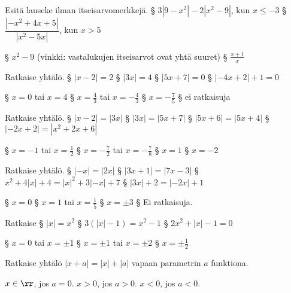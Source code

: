 \begin{tehtavasivu}
\begin{tehtava}
	Esitä lauseke ilman itseisarvomerkkejä.
	\alakohdat
		§ $3|9-x^2|-2|x^2-9|$, kun $x\leq-3$
		§ $\dfrac{|-x^2+4x+5|}{|x^2-5x|}$, kun $x>5$
	\loppu
	\begin{vastaus}
		\alakohdat
			§ $x^2-9$ (vinkki: vastalukujen itseisarvot ovat yhtä suuret)
			§ $\frac{x+1}{x}$
		\loppu
	\end{vastaus}
\end{tehtava}

\begin{tehtava}
	Ratkaise yhtälö.
	\alakohdat
		§ $|x-2|=2$
		§ $|3x|=4$
		§ $|5x+7|=0$
		§ $|-4x+2|+1=0$
	\loppu
	\begin{vastaus}
		\alakohdat
			§ $x=0$ tai $x=4$
			§ $x=\frac{4}{3}$ tai $x=-\frac{4}{3}$
			§ $x=-\frac{7}{5}$
			§ ei ratkaisuja
		\loppu
	\end{vastaus}
\end{tehtava}

\begin{tehtava}
	Ratkaise yhtälö.
	\alakohdat
		§ $|x-2|=|3x|$
		§ $|3x|=|5x+7|$
		§ $|5x+6|=|5x+4|$
		§ $|-2x+2|=|x^2+2x+6|$
	\loppu
	\begin{vastaus}
		\alakohdat
			§ $x=-1$ tai $x=\frac{1}{2}$
			§ $x=-\frac{7}{2}$ tai $x=-\frac{7}{8}$
			§ $x=1$
			§ $x=-2$
		\loppu
	\end{vastaus}
\end{tehtava}

\begin{tehtava}
	Ratkaise yhtälö.
	\alakohdat
		§ $|-x| = |2x|$
		§ $|3x+1|= |7x-3|$
		§ $x^2+4|x|+4 = |x|^2+3|-x|+7$
		§ $|3x|+2 = |-2x|+1$
	\loppu
	\begin{vastaus}
		\alakohdat
			§ $x = 0$
			§ $x = 1$ tai $x = \frac{1}{5}$
			§ $x = \pm 3$
			§ Ei ratkaisuja.
		\loppu
	\end{vastaus}
\end{tehtava}

\begin{tehtava}
	Ratkaise
	\alakohdat
		§ $|x| = x^2$
		§ $3(|x|-1) = x^2-1$
		§ $2x^2+|x|-1 = 0$
	\loppu
	\begin{vastaus}
		\alakohdat
			§ $x = 0$ tai $x = \pm 1$
			§ $x = \pm 1$ tai $x = \pm 2$
			§ $x = \pm \frac{1}{2}$
		\loppu
	\end{vastaus}
\end{tehtava}

\begin{tehtava}
	Ratkaise yhtälö $|x+a| = |x|+|a|$ vapaan parametrin $a$ funktiona.
	\begin{vastaus}
		$x \in \rr$, jos $a=0$. $x>0$, jos $a>0$. $x<0$, jos $a<0$.
	\end{vastaus}
\end{tehtava}


\end{tehtavasivu}
